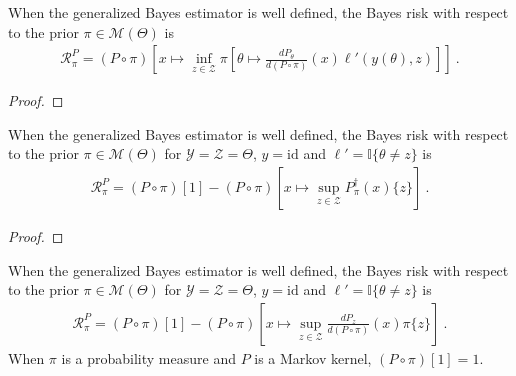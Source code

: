 \begin{lemma}
  \label{lem:bayesRisk_eq_rnDeriv}
  When the generalized Bayes estimator is well defined, the Bayes risk with respect to the prior $\pi \in \mathcal M(\Theta)$ is
  \begin{align*}
  \mathcal R^P_\pi = (P \circ \pi)\left[x \mapsto \inf_{z \in \mathcal Z} \pi \left[\theta \mapsto \frac{d P_\theta}{d (P \circ \pi)}(x) \ell'(y(\theta), z)\right]\right]
  \: .
  \end{align*}
\end{lemma}

\begin{proof}%
{}

\end{proof}


\begin{lemma}
  \label{lem:bayesRisk_binary_eq_sub_bayesInv}
  When the generalized Bayes estimator is well defined, the Bayes risk with respect to the prior $\pi \in \mathcal M(\Theta)$ for $\mathcal Y = \mathcal Z = \Theta$, $y = \mathrm{id}$ and $\ell' = \mathbb{I}\{\theta \ne z\}$ is
  \begin{align*}
  \mathcal R^P_\pi = (P \circ \pi)[1] - (P \circ \pi)\left[x \mapsto \sup_{z \in \mathcal Z} P_\pi^\dagger(x) \{z\}\right]
  \: .
  \end{align*}
\end{lemma}

\begin{proof}%
{}

\end{proof}


\begin{lemma}
  \label{lem:bayesRisk_binary_eq_sub}
  When the generalized Bayes estimator is well defined, the Bayes risk with respect to the prior $\pi \in \mathcal M(\Theta)$ for $\mathcal Y = \mathcal Z = \Theta$, $y = \mathrm{id}$ and $\ell' = \mathbb{I}\{\theta \ne z\}$ is
  \begin{align*}
  \mathcal R^P_\pi = (P \circ \pi)[1] - (P \circ \pi)\left[x \mapsto \sup_{z \in \mathcal Z} \frac{d P_z}{d (P \circ \pi)}(x) \pi\{z\} \right]
  \: .
  \end{align*}
  When $\pi$ is a probability measure and $P$ is a Markov kernel, $(P \circ \pi)[1] = 1$.
\end{lemma}

